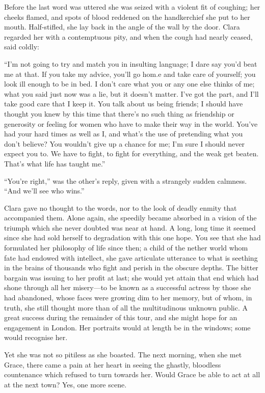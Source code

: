 Before the last word was uttered she was seized with a violent fit of
coughing; her {\protect\hypertarget{211}{}{}}cheeks flamed, and spots of
blood reddened on the handkerchief she put to her mouth. Half-stifled,
she lay back in the angle of the wall by the door. Clara regarded her
with a contemptuous pity, and when the cough had nearly ceased, said
coldly:

``I'm not going to try and match you in insulting language; I dare say
you'd beat me at that. If you take my advice, you'll go hom.e and take
care of yourself; you look ill enough to be in bed. I don't care what
you or any one else thinks of me; what you said just now was a lie, but
it doesn't matter. I've got the part, and I'll take good care that I
keep it. You talk about us being friends; I should have thought you knew
by this time that there's no such thing as friendship or generosity or
feeling for women who have to make their way in the world. You've had
your hard times as well as I, and what's the use of pretending what you
don't believe? You wouldn't give up a chance for me; I'm sure I should
never expect you to. We have to fight, to fight for everything, and the
weak {\protect\hypertarget{212}{}{}}get beaten. That's what life has
taught me.''

``You're right,'' was the other's reply, given with a strangely sudden
calmness. ``And we'll see who wins.''

Clara gave no thought to the words, nor to the look of deadly enmity
that accompanied them. Alone again, she speedily became absorbed in a
vision of the triumph which she never doubted was near at hand. A long,
long time it seemed since she had sold herself to degradation with this
one hope. You see that she had formulated her philosophy of life since
then; a child of the nether world whom fate had endowed with intellect,
she gave articulate utterance to what is seething in the brains of
thousands who fight and perish in the obscure depths. The bitter bargain
was issuing to her profit at last; she would yet attain that end which
had shone through all her misery---to be known as a successful actress
by those she had abandoned, whose faces were growing dim to her memory,
but of whom, in truth, she still {\protect\hypertarget{213}{}{}}thought
more than of all the multitudinous unknown public. A great success
during the remainder of this tour, and she might hope for an engagement
in London. Her portraits would at length be in the windows; some would
recognise her.

Yet she was not so pitiless as she boasted. The next morning, when she
met Grace, there came a pain at her heart in seeing the ghastly,
bloodless countenance which refused to turn towards her. Would Grace be
able to act at all at the next town? Yes, one more scene.


